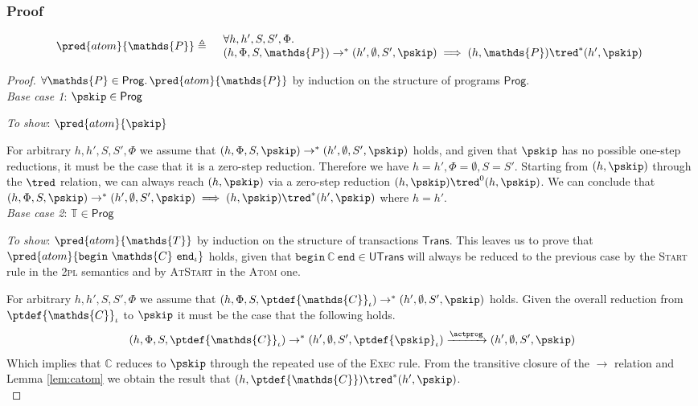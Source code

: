 \subsubsection{Proof}

\[
\begin{array}{r l}
	\pred{atom}{\mathds{P}} \triangleq&
	\begin{array}{l}
	\forall h, h', S, S', \Phi \ldotp \\
	(h, \Phi, S, \mathds{P}) \rightarrow^* (h', \emptyset, S', \pskip) \implies 
	(h, \mathds{P}) \tred^* (h', \pskip)
	\end{array}
\end{array}
\]

{\parindent0pt
\begin{proof}
$\forall \mathds{P} \in \mathsf{Prog} \ldotp \pred{atom}{\mathds{P}}$ by induction on the structure of programs $\mathsf{Prog}$. \\

\textit{Base case 1}: $\pskip \in \mathsf{Prog}$

\textit{To show}: $\pred{atom}{\pskip}$

For arbitrary $h, h', S, S', \Phi$ we assume that $(h, \Phi, S, \pskip) \rightarrow^* (h', \emptyset, S', \pskip)$ holds, and given that $\pskip$ has no possible one-step reductions, it must be the case that it is a zero-step reduction. Therefore we have $h = h', \Phi = \emptyset, S = S'$. Starting from $(h, \pskip)$ through the $\tred$ relation, we can always reach $(h, \pskip)$ via a zero-step reduction $(h, \pskip) \tred^0 (h, \pskip)$. We can conclude that $(h, \Phi, S, \pskip) \rightarrow^* (h', \emptyset, S', \pskip) \implies (h, \pskip) \tred^* (h', \pskip)$ where $h = h'$. \\

\textit{Base case 2}: $\mathds{T} \in \mathsf{Prog}$

\textit{To show}: $\pred{atom}{\mathds{T}}$ by induction on the structure of transactions $\mathsf{Trans}$. This leaves us to prove that $\pred{atom}{\mathtt{begin}\ \mathds{C}\ \mathtt{end}_\iota}$ holds, given that $\mathtt{begin}\ \mathds{C}\ \mathtt{end} \in \mathsf{UTrans}$ will always be reduced to the previous case by the \textsc{Start} rule in the \textsc{2pl} semantics and by \textsc{AtStart} in the \textsc{Atom} one.

For arbitrary $h, h', S, S', \Phi$ we assume that $(h, \Phi, S, \ptdef{\mathds{C}}_\iota) \rightarrow^* (h', \emptyset, S', \pskip)$ holds. Given the overall reduction from $\ptdef{\mathds{C}}_\iota$ to $\pskip$ it must be the case that the following holds.
\[
(h, \Phi, S, \ptdef{\mathds{C}}_\iota) \rightarrow^* (h', \emptyset, S', \ptdef{\pskip}_\iota) \xrightarrow{\actprog} (h', \emptyset, S', \pskip)
\]
Which implies that $\mathds{C}$ reduces to $\pskip$ through the repeated use of the \textsc{Exec} rule. From the transitive closure of the $\rightarrow$ relation and Lemma \ref{lem:catom} we obtain the result that $(h, \ptdef{\mathds{C}}) \tred^* (h', \pskip)$. \\


\end{proof}}
